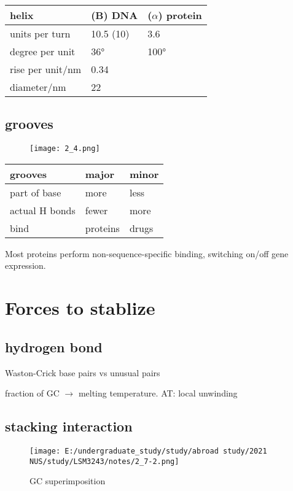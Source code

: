\begin{longtable}[]{@{}lll@{}}
\toprule
helix & (B) DNA & (\(\alpha\)) protein\tabularnewline
\midrule
\endhead
units per turn & 10.5 (10) & 3.6\tabularnewline
degree per unit & \ang{36} & \ang{100}\tabularnewline
rise per unit/nm & 0.34 &\tabularnewline
diameter/nm & 22 &\tabularnewline
\bottomrule
\end{longtable}

\hypertarget{grooves}{%
\subsection{grooves}\label{grooves}}

\begin{figure}
\centering
\texttt{[image: 2\_4.png]}
\end{figure}

\begin{longtable}[]{@{}lll@{}}
\toprule
grooves & major & minor\tabularnewline
\midrule
\endhead
part of base & more & less\tabularnewline
actual H bonds & fewer & more\tabularnewline
bind & proteins & drugs\tabularnewline
\bottomrule
\end{longtable}

Most proteins perform non-sequence-specific binding, switching on/off
gene expression.

\hypertarget{forces-to-stablize}{%
\section{Forces to stablize}\label{forces-to-stablize}}

\hypertarget{hydrogen-bond-2}{%
\subsection{hydrogen bond}\label{hydrogen-bond-2}}

Waston-Crick base pairs vs unusual pairs

fraction of GC \(\to\) melting temperature. AT: local unwinding

\hypertarget{stacking-interaction}{%
\subsection{stacking interaction}\label{stacking-interaction}}

\begin{figure}
\centering
\texttt{[image: E:/undergraduate\_study/study/abroad study/2021 NUS/study/LSM3243/notes/2\_7-2.png]}
\caption*{GC superimposition}
\end{figure}

